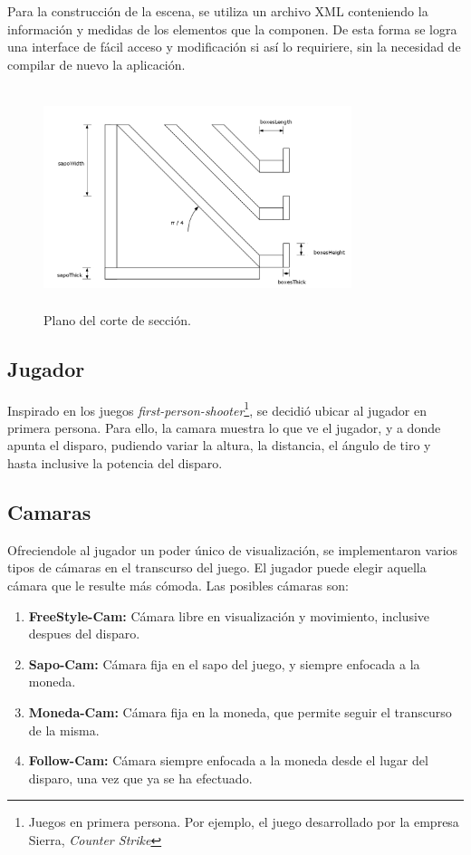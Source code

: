 \documentclass{acm_proc_article-sp}
\begin{document}
Para la construcci\'on de la escena, se utiliza un archivo XML conteniendo la informaci\'on y medidas de los elementos que la componen. De esta forma se logra una interface de f\'acil acceso y modificaci\'on si as\'i lo requiriere, sin la necesidad de compilar de nuevo la aplicaci\'on.

\begin{figure}[!ht]
	\centering
		\includegraphics[width=9cm,height=6.45cm]{img/sapoLayout.png}
	\caption{Plano del corte de secci\'on.}
	\label{fig:sapoSection}
\end{figure}


\subsection{Jugador}
\label{impl:jugador}

Inspirado en los juegos \textit{first-person-shooter}\footnote{Juegos en primera persona. Por ejemplo, el juego desarrollado por 
la empresa Sierra, \textit{Counter Strike}}, se decidi\'o ubicar al jugador en primera persona. Para ello, la camara muestra lo 
que ve el jugador, y a donde apunta el disparo, pudiendo variar la altura, la distancia, el \'angulo de tiro y hasta inclusive 
la potencia del disparo.

\subsection{Camaras}
\label{impl:camaras}

Ofreciendole al jugador un poder \'unico de visualizaci\'on, se implementaron varios tipos de c\'amaras en el transcurso del juego. El jugador puede elegir aquella c\'amara que le resulte m\'as c\'omoda. Las posibles c\'amaras son:

\begin{enumerate}
\item \textbf{FreeStyle-Cam:} C\'amara libre en visualizaci\'on y movimiento, inclusive despues del disparo. \\
\item \textbf{Sapo-Cam:} C\'amara fija en el sapo del juego, y siempre enfocada a la moneda. \\
\item \textbf{Moneda-Cam:} C\'amara fija en la moneda, que permite seguir el transcurso de la misma. \\
\item \textbf{Follow-Cam:} C\'amara siempre enfocada a la moneda desde el lugar del disparo, una vez que ya se ha efectuado. \\
\end{enumerate}
\end{document}
